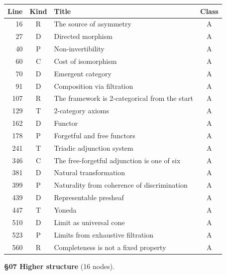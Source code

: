 \begin{center}
\scriptsize
\begin{tabular}{r|c|l|c}
\textbf{Line} & \textbf{Kind} & \textbf{Title} & \textbf{Class} \\
\hline
16 & \textsf{R} & The source of asymmetry & A \\
27 & \textsf{D} & Directed morphism & A \\
40 & \textsf{P} & Non-invertibility & A \\
60 & \textsf{C} & Cost of isomorphism & A \\
70 & \textsf{D} & Emergent category & A \\
91 & \textsf{D} & Composition via filtration & A \\
107 & \textsf{R} & The framework is 2-categorical from the start & A \\
129 & \textsf{T} & 2-category axioms & A \\
162 & \textsf{D} & Functor & A \\
178 & \textsf{P} & Forgetful and free functors & A \\
241 & \textsf{T} & Triadic adjunction system & A \\
346 & \textsf{C} & The free-forgetful adjunction is one of six & A \\
381 & \textsf{D} & Natural transformation & A \\
399 & \textsf{P} & Naturality from coherence of discrimination & A \\
439 & \textsf{D} & Representable presheaf & A \\
447 & \textsf{T} & Yoneda & A \\
510 & \textsf{D} & Limit as universal cone & A \\
523 & \textsf{P} & Limits from exhaustive filtration & A \\
560 & \textsf{R} & Completeness is not a fixed property & A \\
\end{tabular}
\end{center}

\medskip
\noindent\textbf{\S07 Higher structure} (16 nodes).

